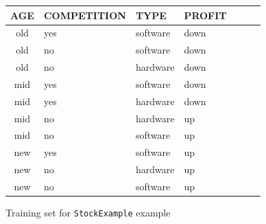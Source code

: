 \documentclass{report}
\begin{document}
\begin{figure}[h]
  \centering
  \begin{tabular}{|c|l|l|l|l|l|l|}
    \hline
    AGE & COMPETITION & TYPE & PROFIT\\
    \hline
    old	& yes & software & down
    \\\hline
    old & no & software & down
    \\\hline
    old	& no & hardware & down
    \\\hline
   	mid	& yes & software & down
    \\\hline
    mid	& yes & hardware & down
    \\\hline
    mid & no & hardware & up
    \\\hline
    mid & no & software & up
    \\\hline
    new & yes & software & up
    \\\hline
    new & no & hardware	& up
	\\\hline
	new	& no & software	& up
	\\\hline
   
  \end{tabular}
  \caption{Training set for \texttt{StockExample} example}
  \label{fig:stockexample}
\end{figure}







\end{document}
